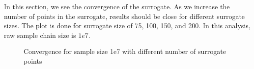  In this section, we see the convergence of the surrogate. As we increase the number of points in the surrogate, results should be close for different surrogate sizes. The plot is done for surrogate size of 75, 100, 150, and 200. In this analysis, raw sample chain size is $1e7$. 

\begin{figure}[H]
\caption{Convergence for sample size 1e7 with different number of surrogate points}
\end{figure}


